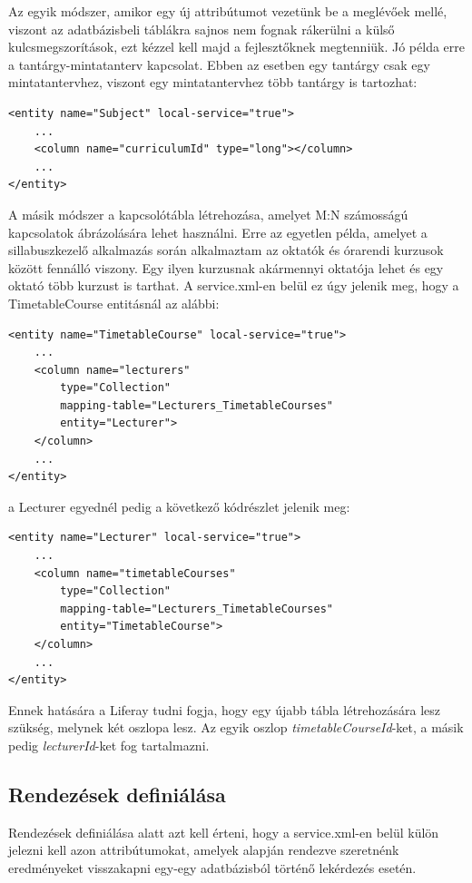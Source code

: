 \documentclass[hidelinks, 12pt, a4paper]{report}
\begin{document}
Az egyik módszer, amikor egy új attribútumot vezetünk be a meglévőek mellé, viszont az adatbázisbeli táblákra sajnos nem fognak rákerülni a külső kulcsmegszorítások, ezt kézzel kell majd a fejlesztőknek megtenniük. Jó példa erre a tantárgy-mintatanterv kapcsolat. Ebben az esetben egy tantárgy csak egy mintatantervhez, viszont egy mintatantervhez több tantárgy is tartozhat:

\begin{lstlisting}[style=customxml]
<entity name="Subject" local-service="true">
	...
	<column name="curriculumId" type="long"></column>
	...
</entity>
\end{lstlisting}

A másik módszer a kapcsolótábla létrehozása, amelyet M:N számosságú kapcsolatok ábrázolására lehet használni. Erre az egyetlen példa, amelyet a sillabuszkezelő alkalmazás során alkalmaztam az oktatók és órarendi kurzusok között fennálló viszony. Egy ilyen kurzusnak akármennyi oktatója lehet és egy oktató több kurzust is tarthat. A service.xml-en belül ez úgy jelenik meg, hogy a TimetableCourse entitásnál az alábbi: 

\begin{lstlisting}[style=customxml]
<entity name="TimetableCourse" local-service="true">
	...
	<column name="lecturers"
		type="Collection"
		mapping-table="Lecturers_TimetableCourses"
		entity="Lecturer">
	</column>
	...
</entity>
\end{lstlisting}

\noindent a Lecturer egyednél pedig a következő kódrészlet jelenik meg:

\begin{lstlisting}[style=customxml]
<entity name="Lecturer" local-service="true">
	...
	<column name="timetableCourses"
		type="Collection"
		mapping-table="Lecturers_TimetableCourses"
		entity="TimetableCourse">
	</column>
	...
</entity>
\end{lstlisting}

\noindent Ennek hatására a Liferay tudni fogja, hogy egy újabb tábla létrehozására lesz szükség, melynek két oszlopa lesz. Az egyik oszlop \emph{timetableCourseId}-ket, a másik pedig \emph{lecturerId}-ket fog tartalmazni.

\subsection{Rendezések definiálása}

Rendezések definiálása alatt azt kell érteni, hogy a service.xml-en belül külön jelezni kell azon attribútumokat, amelyek alapján rendezve szeretnénk eredményeket visszakapni egy-egy adatbázisból történő lekérdezés esetén.
\end{document}
